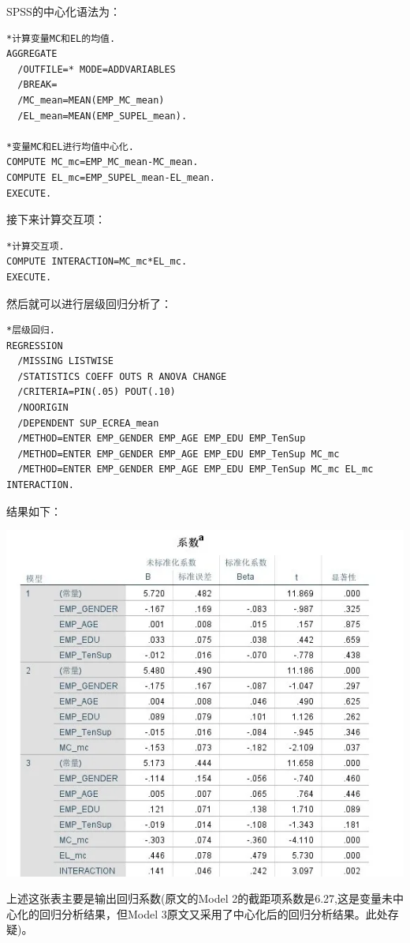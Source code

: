 \documentclass[
]{book}
\begin{document}
SPSS的中心化语法为：

\begin{verbatim}
*计算变量MC和EL的均值.
AGGREGATE
  /OUTFILE=* MODE=ADDVARIABLES
  /BREAK=
  /MC_mean=MEAN(EMP_MC_mean) 
  /EL_mean=MEAN(EMP_SUPEL_mean).

*变量MC和EL进行均值中心化.
COMPUTE MC_mc=EMP_MC_mean-MC_mean.
COMPUTE EL_mc=EMP_SUPEL_mean-EL_mean.
EXECUTE.
\end{verbatim}

接下来计算交互项：

\begin{verbatim}
*计算交互项.
COMPUTE INTERACTION=MC_mc*EL_mc.
EXECUTE.
\end{verbatim}

然后就可以进行层级回归分析了：

\begin{verbatim}
*层级回归.
REGRESSION
  /MISSING LISTWISE
  /STATISTICS COEFF OUTS R ANOVA CHANGE
  /CRITERIA=PIN(.05) POUT(.10)
  /NOORIGIN 
  /DEPENDENT SUP_ECREA_mean
  /METHOD=ENTER EMP_GENDER EMP_AGE EMP_EDU EMP_TenSup
  /METHOD=ENTER EMP_GENDER EMP_AGE EMP_EDU EMP_TenSup MC_mc
  /METHOD=ENTER EMP_GENDER EMP_AGE EMP_EDU EMP_TenSup MC_mc EL_mc INTERACTION.
\end{verbatim}

结果如下：

\includegraphics{figs/1318.png}

上述这张表主要是输出回归系数(原文的Model 2的截距项系数是6.27,这是变量未中心化的回归分析结果，但Model 3原文又采用了中心化后的回归分析结果。此处存疑)。
\end{document}
